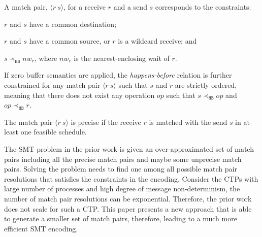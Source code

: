 \begin{definition}
A match pair, $\langle r\ s\rangle$, for a receive $r$ and a send $s$ corresponds to the constraints:
\begin{compactenum}
\item $r$ and $s$ have a common destination;
\item $r$ and $s$ have a common source, or $r$ is a wildcard receive; and
\item $s \prec_{\mathtt{HB}} nw_r$, where $nw_r$ is the nearest-enclosing wait of $r$.
\end{compactenum}
\end{definition} 
If zero buffer semantics are applied, the \textit{happens-before} relation is further constrained for any match pair $\langle r\ s \rangle$ such that $s$ and $r$ are strictly ordered, meaning that there does not exist any operation $op$ such that $s \prec_{\mathtt{HB}} op$ and $op \prec_{\mathtt{HB}} r$. 

\begin{lemma}
The match pair $\langle r\ s\rangle$ is precise if the receive $r$ is matched with the send $s$ in at least one feasible schedule.
\end{lemma}


The SMT problem in the prior work is given an over-approximated set of match pairs including all the precise match pairs and maybe some unprecise match pairs. Solving the problem needs to find one among all possible match pair resolutions that satisfies the constraints in the encoding. Consider the CTPs with large number of processes and high degree of message non-determinism, the number of match pair resolutions can be exponential. Therefore, the prior work does not scale for such a CTP. This paper presents a new approach that is able to generate a smaller set of match pairs, therefore, leading to a much more efficient SMT encoding.






